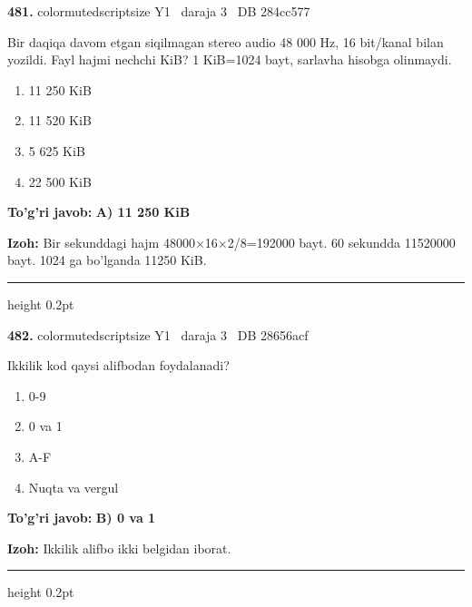 \documentclass[10pt,a4paper,oneside]{article}
\begin{document}
\noindent\textbf{\color{ink}481.}  {color{muted}scriptsize Y1 \textbullet\ daraja 3 \textbullet\ DB 284cc577}
\par
Bir daqiqa davom etgan siqilmagan stereo audio 48 000 Hz, 16 bit/kanal bilan yozildi. Fayl hajmi nechchi KiB? 1 KiB=1024 bayt, sarlavha hisobga olinmaydi.
\begin{enumerate}[label=\Alph*),leftmargin=9mm]
\item 11 250 KiB
\item 11 520 KiB
\item 5 625 KiB
\item 22 500 KiB
\end{enumerate}
\begin{tcolorbox}[enhanced,breakable,colback=teal!4,colframe=teal!50!black,boxrule=0.5pt,arc=1.1mm,left=3mm,right=3mm,top=1.7mm,bottom=1.7mm,before skip=2mm,after skip=2mm]
\textbf{\color{teal}To'g'ri javob:} \textbf{A) 11 250 KiB}
\par\smallskip
\textbf{Izoh:} Bir sekunddagi hajm 48000\ensuremath{\times}16\ensuremath{\times}2/8=192000 bayt. 60 sekundda 11520000 bayt. 1024 ga bo'lganda 11250 KiB.
\end{tcolorbox}
\vspace{2mm}\hrule height 0.2pt \vspace{3mm}

\noindent\textbf{\color{ink}482.}  {color{muted}scriptsize Y1 \textbullet\ daraja 3 \textbullet\ DB 28656acf}
\par
Ikkilik kod qaysi alifbodan foydalanadi?
\begin{enumerate}[label=\Alph*),leftmargin=9mm]
\item 0-9
\item 0 va 1
\item A-F
\item Nuqta va vergul
\end{enumerate}
\begin{tcolorbox}[enhanced,breakable,colback=teal!4,colframe=teal!50!black,boxrule=0.5pt,arc=1.1mm,left=3mm,right=3mm,top=1.7mm,bottom=1.7mm,before skip=2mm,after skip=2mm]
\textbf{\color{teal}To'g'ri javob:} \textbf{B) 0 va 1}
\par\smallskip
\textbf{Izoh:} Ikkilik alifbo ikki belgidan iborat.
\end{tcolorbox}
\vspace{2mm}\hrule height 0.2pt \vspace{3mm}
\end{document}
